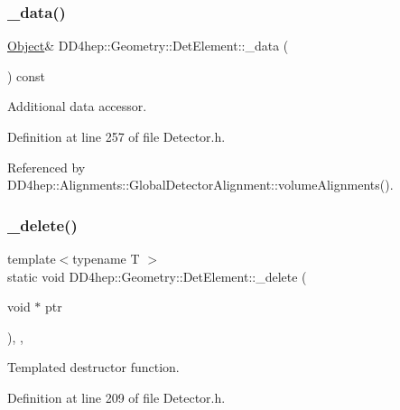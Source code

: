 \subsubsection{\texorpdfstring{\+\_\+data()}{\_data()}}
{\footnotesize\ttfamily \hyperlink{class_d_d4hep_1_1_geometry_1_1_det_element_a4e44e860d6e5827d9f42a4aea3a4f288}{Object}\& D\+D4hep\+::\+Geometry\+::\+Det\+Element\+::\+\_\+data (\begin{DoxyParamCaption}{ }\end{DoxyParamCaption}) const\hspace{0.3cm}{\ttfamily [inline]}}



Additional data accessor. 



Definition at line 257 of file Detector.\+h.



Referenced by D\+D4hep\+::\+Alignments\+::\+Global\+Detector\+Alignment\+::volume\+Alignments().

\hypertarget{class_d_d4hep_1_1_geometry_1_1_det_element_ae50e83aa675d0f3eae3cfed01a597bec}{}\label{class_d_d4hep_1_1_geometry_1_1_det_element_ae50e83aa675d0f3eae3cfed01a597bec} 
\subsubsection{\texorpdfstring{\+\_\+delete()}{\_delete()}}
{\footnotesize\ttfamily template$<$typename T $>$ \\
static void D\+D4hep\+::\+Geometry\+::\+Det\+Element\+::\+\_\+delete (\begin{DoxyParamCaption}\item[{void $\ast$}]{ptr }\end{DoxyParamCaption})\hspace{0.3cm}{\ttfamily [inline]}, {\ttfamily [static]}, {\ttfamily [protected]}}



Templated destructor function. 



Definition at line 209 of file Detector.\+h.

\hypertarget{class_d_d4hep_1_1_geometry_1_1_det_element_a336e54ac88a2f3493f82138699899517}{}\label{class_d_d4hep_1_1_geometry_1_1_det_element_a336e54ac88a2f3493f82138699899517} 
